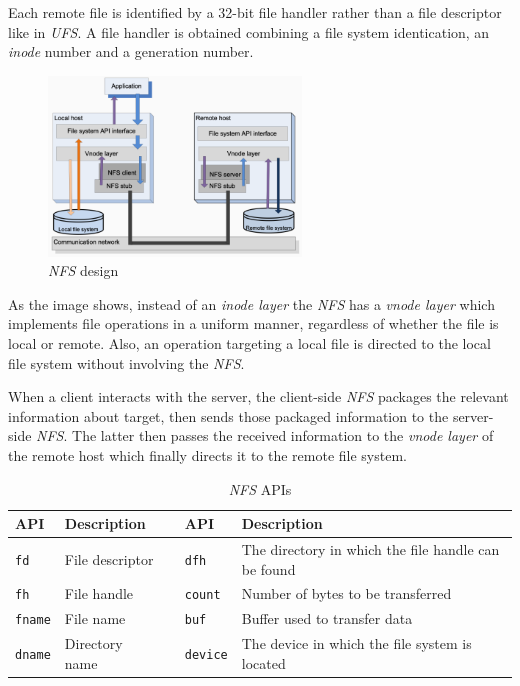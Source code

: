 Each remote file is identified by a 32-bit file handler rather than a file
descriptor like in \emph{UFS}. A file handler is obtained combining a file
system identication, an \emph{inode} number and a generation number.

\begin{figure}[h!]
    \centering
    \includegraphics[width=0.6\textwidth]{images/nfs-design.png}
    \caption{\emph{NFS} design}
\end{figure}

\noindent
As the image shows, instead of an \emph{inode layer} the \emph{NFS} has a
\emph{vnode layer} which implements file operations in a uniform manner,
regardless of whether the file is local or remote. Also, an operation targeting
a local file is directed to the local file system without involving the \emph{NFS}.

When a client interacts with the server, the client-side \emph{NFS} packages the
relevant information about target, then sends those packaged information to the
server-side \emph{NFS}. The latter then passes the received information to the
\emph{vnode layer} of the remote host which finally directs it to the remote
file system.

\newpage
\begin{table}[ht!]
    \centering
    \begin{tabular}{|l|l|c|l|p{}|}
        \hline
        \textbf{API} & \textbf{Description} && \textbf{API} & \textbf{Description}\\
        \hline
        \texttt{fd} & File descriptor && \texttt{dfh} & The directory in which the file
        handle can be found\\
        \hline
        \texttt{fh} & File handle && \texttt{count} & Number of bytes to be transferred\\
        \hline
        \texttt{fname} & File name && \texttt{buf} & Buffer used to transfer data\\
        \hline
        \texttt{dname} & Directory name && \texttt{device} & The device in which the
        file system is located\\
        \hline
    \end{tabular}
    \caption{\emph{NFS} APIs}
\end{table}

